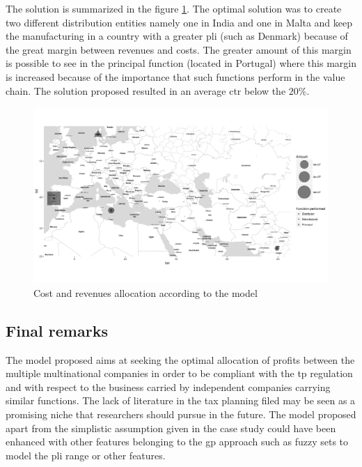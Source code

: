 \begin{doublespace}
The solution is summarized in the figure \ref{fig:allocationmap}. The optimal solution was to create two different distribution entities namely one in India and one in Malta and keep the manufacturing in a country with a greater \gls{pli} (such as Denmark) because of the great margin between revenues and costs. The greater amount of this margin is possible to see in the principal function (located in Portugal) where this margin is increased because of the importance that such functions perform in the value chain. The solution proposed resulted in an average \gls{ctr} below the $20\%$.

\begin{figure}
\centering
\includegraphics[width=\textwidth]{Images/AllocationMap.png}
\caption{Cost and revenues allocation according to the model}
\label{fig:allocationmap}
\end{figure}

\subsection{Final remarks}
The model proposed aims at seeking the optimal allocation of profits between the multiple multinational companies in order to be compliant with the \gls{tp} regulation and with respect to the business carried by independent companies carrying similar functions. The lack of literature in the tax planning filed may be seen as a promising niche that researchers should pursue in the future. The model proposed apart from the simplistic assumption given in the case study could have been enhanced with other features belonging to the \gls{gp} approach such as fuzzy sets to model the \gls{pli} range or other features. 

\end{doublespace}
